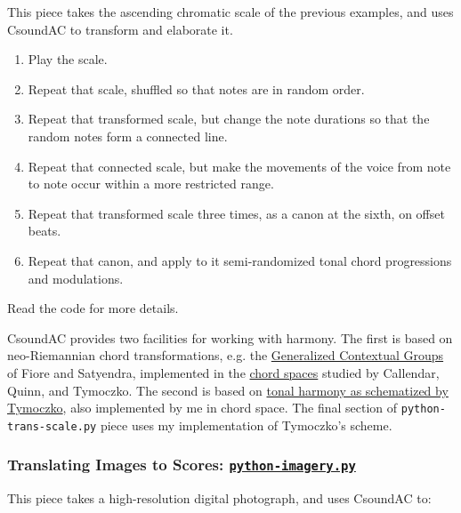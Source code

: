 \documentclass[letterpaper,10pt,DIV=12,parskip=half]{scrartcl}
\begin{document}
This piece takes the ascending chromatic scale of the previous examples, and uses CsoundAC to transform and elaborate it. 

\begin{enumerate}
\item Play the scale.
\item Repeat that scale, shuffled so that notes are in random order.
\item Repeat that transformed scale, but change the note durations so that the random notes form a connected line.
\item Repeat that connected scale, but make the movements of the voice from note to note occur within a more restricted range.
\item Repeat that transformed scale three times, as a canon at the sixth, on offset beats.
\item Repeat that canon, and apply to it semi-randomized tonal chord progressions and modulations.
\end{enumerate}

Read the code for more details.

\begin{canaryframed}
CsoundAC provides two facilities for working with harmony. The first is based on neo-Riemannian chord transformations, e.g. the \href{https://www.mtosmt.org/issues/mto.05.11.3/mto.05.11.3.fiore_satyendra.pdf}{Generalized Contextual Groups} of Fiore and Satyendra, implemented in the \href{https://dmitri.mycpanel.princeton.edu/files/publications/science2.pdf}{chord spaces} studied by Callendar, Quinn, and Tymoczko. The second is based on \href{https://doi.org/10.1093/oso/9780197577103.001.0001}{tonal harmony as schematized by Tymoczko}, also implemented by me in chord space. The final section of \lstinline|python-trans-scale.py| piece uses my implementation of Tymoczko's scheme.
\end{canaryframed}

\subsubsection{Translating Images to Scores:  \href{https://github.com/gogins/csound-ac/blob/master/user-guide/python-imagery.py}{\lstinline|python-imagery.py|}}

This piece takes a high-resolution digital photograph, and uses CsoundAC to:
\end{document}
